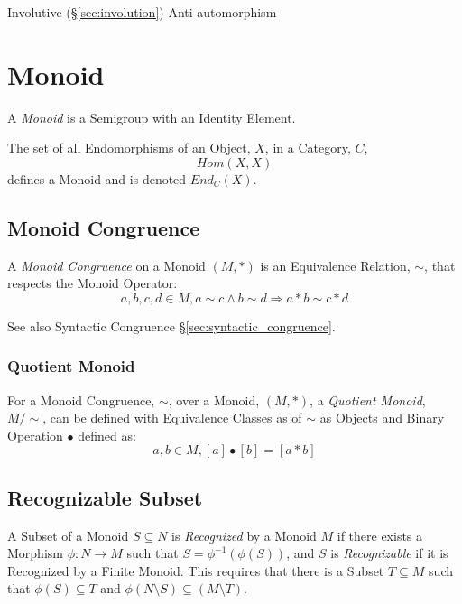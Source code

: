 Involutive (\S\ref{sec:involution}) Anti-automorphism



\section{Monoid}\label{sec:monoid}

A \emph{Monoid} is a Semigroup with an Identity Element.

The set of all Endomorphisms of an Object, $X$, in a Category, $C$,
\[
    Hom(X,X)
\]
defines a Monoid and is denoted $End_C(X)$.



\subsection{Monoid Congruence}\label{sec:monoid_congruence}

A \emph{Monoid Congruence} on a Monoid $(M,*)$ is an Equivalence
Relation, $\sim$, that respects the Monoid Operator:
\[
  a,b,c,d \in M, a \sim c \wedge b \sim d \Rightarrow a*b \sim c*d
\]

See also Syntactic Congruence \S\ref{sec:syntactic_congruence}.



\subsubsection{Quotient Monoid}\label{sec:quotient_monoid}

For a Monoid Congruence, $\sim$, over a Monoid, $(M,*)$, a
\emph{Quotient Monoid}, $M/\sim$, can be defined with Equivalence
Classes as of $\sim$ as Objects and Binary Operation $\bullet$ defined
as:
\[
  a,b \in M, [a]\bullet[b] = [a*b]
\]



\subsection{Recognizable Subset}\label{sec:recognizable}

A Subset of a Monoid $S \subseteq N$ is \emph{Recognized} by a Monoid
$M$ if there exists a Morphism $\phi : N \rightarrow M$ such that $S =
\phi^{-1}(\phi(S))$, and $S$ is \emph{Recognizable} if it is
Recognized by a Finite Monoid. This requires that there is a Subset $T
\subseteq M$ such that $\phi(S) \subseteq T$ and $\phi(N \setminus S)
\subseteq (M \setminus T)$.

